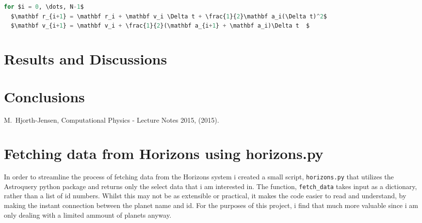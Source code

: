 \documentclass[10pt,showpacs,preprintnumbers,footinbib,amsmath,amssymb,aps,prl,twocolumn,groupedaddress,superscriptaddress,showkeys]{revtex4-1}
\begin{document}
\begin{lstlisting}[mathescape=true, language=python, title=Velocity-Verlet Algorithm]
for $i = 0, \dots, N-1$
  $\mathbf r_{i+1} = \mathbf r_i + \mathbf v_i \Delta t + \frac{1}{2}\mathbf a_i(\Delta t)^2$
  $\mathbf v_{i+1} = \mathbf v_i + \frac{1}{2}(\mathbf a_{i+1} + \mathbf a_i)\Delta t  $
\end{lstlisting}

\section{Results and Discussions}

\section{Conclusions}


\begin{thebibliography}{99}
 M.~Hjorth-Jensen, Computational Physics - Lecture Notes 2015, (2015).
\end{thebibliography}

\appendix
\section{Fetching data from Horizons using horizons.py}
  In order to streamline the process of fetching data from the Horizons system i created a small script, \lstinline{horizons.py} that utilizes the Astroquery python package and returns only the select data that i am interested in. The function, \lstinline{fetch_data} takes input as a dictionary, rather than a list of id numbers. Whilst this may not be as extensible or practical, it makes the code easier to read and understand, by making the instant connection between the planet name and id. For the purposes of this project, i find that much more valuable since i am only dealing with a limited ammount of planets anyway.
\end{document}

